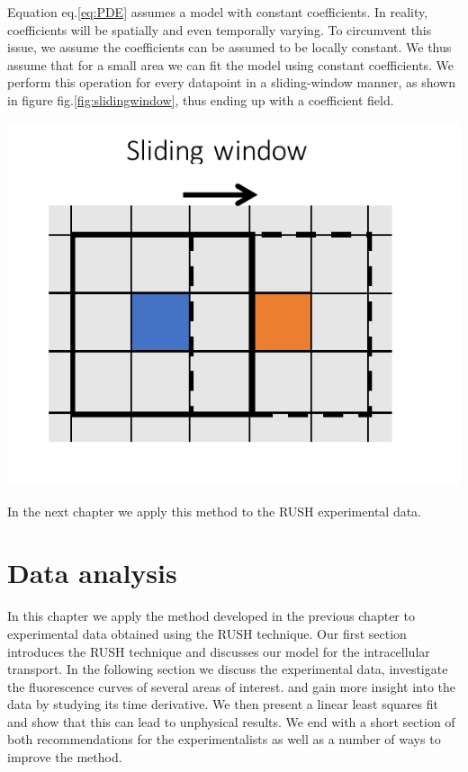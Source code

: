 \documentclass[12pt,a4paper,]{Dissertate}
\let\origfigure\figure
\let\endorigfigure\endfigure
\renewenvironment{figure}[1][2] {
    \expandafter\origfigure\expandafter[H]
} {
    \endorigfigure
}
\begin{document}
Equation eq.\ref{eq:PDE} assumes a model with constant coefficients. In
reality, coefficients will be spatially and even temporally varying. To
circumvent this issue, we assume the coefficients can be assumed to be
locally constant. We thus assume that for a small area we can fit the
model using constant coefficients. We perform this operation for every
datapoint in a sliding-window manner, as shown in figure
fig.\ref{fig:slidingwindow}, thus ending up with a coefficient field.

\begin{figure}
\hypertarget{fig:slidingwindow}{%
\centering
\includegraphics{source/figures/pdf/slidingwindow.pdf}
\caption{Schematic overview of the sliding window technique. The solid
black line encompasses an area around its blue coloured central pixel
and the fit output is assigned to that pixel. We then move the window
(dashed black line) and perform the fit for the orange coloured
pixel.}\label{fig:slidingwindow}
}
\end{figure}

In the next chapter we apply this method to the RUSH experimental data.

\hypertarget{data-analysis}{%
\chapter{Data analysis}\label{data-analysis}}

In this chapter we apply the method developed in the previous chapter to
experimental data obtained using the RUSH technique. Our first section
introduces the RUSH technique and discusses our model for the
intracellular transport. In the following section we discuss the
experimental data, investigate the fluorescence curves of several areas
of interest. and gain more insight into the data by studying its time
derivative. We then present a linear least squares fit and show that
this can lead to unphysical results. We end with a short section of both
recommendations for the experimentalists as well as a number of ways to
improve the method.
\end{document}
